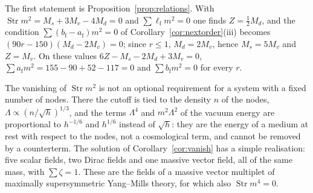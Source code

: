 \documentclass[11pt,a4paper]{article}
\makeatletter
\theoremstyle{stmt}
\theoremstyle{defn}
\theoremstyle{rmk}
\renewenvironment{proof}[1][\proofname]{\par\pushQED{\qed}\normalfont\topsep6\p@\@plus6\p@\relax
  \trivlist\item[\hskip\labelsep{\sffamily\itshape\small #1.}]\ignorespaces}{\popQED\endtrivlist\@endpefalse}
\numberwithin{equation}{section}
\makeatother
\begin{document}
\begin{proof}
The first statement is Proposition~\ref{prop:relations}. With $\operatorname{Str}m^2=M_s+3M_v-4M_d=0$ and $\sum\ell_{\mathrm f}m^2=0$ one finds $Z=\tfrac12M_d$, and the condition $\sum(b_{\mathrm f}-a_{\mathrm f})m^2=0$ of Corollary~\ref{cor:nextorder}(iii) becomes $(90r-150)(M_d-2M_v)=0$; since $r\le1$, $M_d=2M_v$, hence $M_s=5M_v$ and $Z=M_v$. On these values $6Z-M_s-2M_d+3M_v=0$, $\sum a_{\mathrm f}m^2=155-90+52-117=0$ and $\sum b_{\mathrm f}m^2=0$ for every $r$.
\end{proof}

The vanishing of $\operatorname{Str}m^2$ is not an optional requirement for a system with a fixed number of nodes. There the cutoff is tied to the density $n$ of the nodes, $\Lambda\propto(n/\sqrt h)^{1/3}$, and the terms $\Lambda^4$ and $m^2\Lambda^2$ of the vacuum energy are proportional to $h^{-1/6}$ and $h^{1/6}$ instead of $\sqrt h$: they are the energy of a medium at rest with respect to the nodes, not a cosmological term, and cannot be removed by a counterterm. The solution of Corollary~\ref{cor:vanish} has a simple realisation: five scalar fields, two Dirac fields and one massive vector field, all of the same mass, with $\sum\zeta=1$. These are the fields of a massive vector multiplet of maximally supersymmetric Yang--Mills theory, for which also $\operatorname{Str}m^4=0$.
\end{document}
